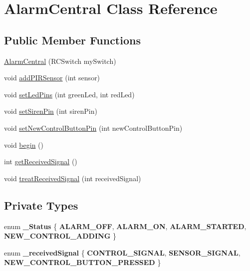 \hypertarget{classAlarmCentral}{\section{Alarm\+Central Class Reference}
\label{classAlarmCentral}
}
\subsection*{Public Member Functions}
\begin{DoxyCompactItemize}
\item 
\hyperlink{classAlarmCentral_a20cf0b433a5f7a745bad9fdceada83ed}{Alarm\+Central} (R\+C\+Switch my\+Switch)
\item 
void \hyperlink{classAlarmCentral_a309842cb51ffc4cf5c0b31d177accd8e}{add\+P\+I\+R\+Sensor} (int sensor)
\item 
void \hyperlink{classAlarmCentral_a1c8793e3ca800e7f5446fb20b5eed3f2}{set\+Led\+Pins} (int green\+Led, int red\+Led)
\item 
void \hyperlink{classAlarmCentral_a98cb7cc543581e2fad8257e3d200a7e4}{set\+Siren\+Pin} (int siren\+Pin)
\item 
void \hyperlink{classAlarmCentral_a996dc61f1e4908f7c61d52fc20cd3126}{set\+New\+Control\+Button\+Pin} (int new\+Control\+Button\+Pin)
\item 
void \hyperlink{classAlarmCentral_a28f388825ec7caeea038dcff3632b8b6}{begin} ()
\item 
int \hyperlink{classAlarmCentral_a687b130505b9500ac8e96a6b8b8eaf85}{get\+Received\+Signal} ()
\item 
void \hyperlink{classAlarmCentral_a0f7836737d8de5b39dc33d257f2bb88f}{treat\+Received\+Signal} (int received\+Signal)
\end{DoxyCompactItemize}
\subsection*{Private Types}
\begin{DoxyCompactItemize}
\item 
\hypertarget{classAlarmCentral_a05d576dae5c6c13199e53aefee2520c4}{enum {\bfseries \+\_\+\+Status} \{ {\bfseries A\+L\+A\+R\+M\+\_\+\+O\+F\+F}, 
{\bfseries A\+L\+A\+R\+M\+\_\+\+O\+N}, 
{\bfseries A\+L\+A\+R\+M\+\_\+\+S\+T\+A\+R\+T\+E\+D}, 
{\bfseries N\+E\+W\+\_\+\+C\+O\+N\+T\+R\+O\+L\+\_\+\+A\+D\+D\+I\+N\+G}
 \}}\label{classAlarmCentral_a05d576dae5c6c13199e53aefee2520c4}

\item 
\hypertarget{classAlarmCentral_a8a169a9915dddbb4644643bc05780870}{enum {\bfseries \+\_\+received\+Signal} \{ {\bfseries C\+O\+N\+T\+R\+O\+L\+\_\+\+S\+I\+G\+N\+A\+L}, 
{\bfseries S\+E\+N\+S\+O\+R\+\_\+\+S\+I\+G\+N\+A\+L}, 
{\bfseries N\+E\+W\+\_\+\+C\+O\+N\+T\+R\+O\+L\+\_\+\+B\+U\+T\+T\+O\+N\+\_\+\+P\+R\+E\+S\+S\+E\+D}
 \}}\label{classAlarmCentral_a8a169a9915dddbb4644643bc05780870}

\end{DoxyCompactItemize}
